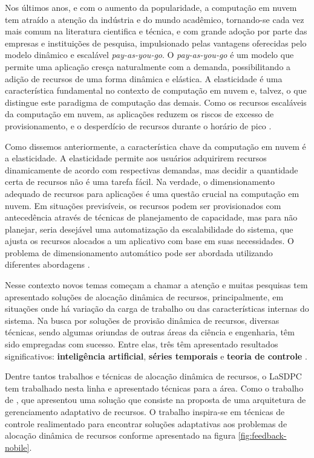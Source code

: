 Nos últimos anos, e com o aumento da popularidade, a computação em nuvem tem atraído a atenção da indústria e do mundo acadêmico, tornando-se cada vez mais comum na literatura cientifica e técnica, e com grande adoção por parte das empresas e instituições de pesquisa, impulsionado pelas vantagens oferecidas pelo modelo dinâmico e escalável \textit{pay-as-you-go}. O \textit{pay-as-you-go} é um modelo que permite uma aplicação cresça naturalmente com a demanda, possibilitando a adição de recursos de uma forma dinâmica e elástica. A elasticidade é uma característica fundamental no contexto de computação em nuvem e, talvez, o que distingue este paradigma de computação das demais. Como os recursos escaláveis da computação em nuvem, as aplicações reduzem os riscos de excesso de provisionamento, e o desperdício de recursos durante o horário de pico \cite{vazquez2014, galante2012}.

Como dissemos anteriormente, a característica chave da computação em nuvem é a elasticidade. A elasticidade permite aos usuários adquirirem recursos dinamicamente de acordo com respectivas demandas, mas decidir a quantidade certa de recursos não é uma tarefa fácil. Na verdade, o dimensionamento adequado de recursos para aplicações é uma questão crucial na computação em nuvem. Em situações previsíveis, os recursos podem ser provisionados com antecedência através de técnicas de planejamento de capacidade, mas para não planejar, seria desejável uma automatização da escalabilidade do sistema, que ajusta os recursos alocados a um aplicativo com base em suas necessidades. O problema de dimensionamento automático pode ser abordada utilizando diferentes abordagens \cite{Tania2012}.  

Nesse contexto novos temas começam a chamar a atenção e muitas pesquisas tem apresentado soluções de alocação dinâmica de recursos, principalmente, em situações onde há variação da carga de trabalho ou das características internas do sistema. 
Na busca por soluções de provisão dinâmica de recursos, diversas técnicas, sendo algumas oriundas de outras áreas da ciência e engenharia, têm sido empregadas com sucesso. Entre elas, três têm apresentado resultados significativos: \textbf{inteligência artificial}, \textbf{séries temporais} e \textbf{teoria de controle} \cite{Nobile2013}.

Dentre tantos trabalhos e técnicas de alocação dinâmica de recursos, o LaSDPC tem trabalhado nesta linha e apresentado técnicas para a área. Como o trabalho de , que apresentou uma solução que consiste na proposta de uma arquitetura de gerenciamento adaptativo de recursos. O trabalho inspira-se em técnicas de controle realimentado para encontrar soluções adaptativas aos problemas de alocação dinâmica de recursos conforme apresentado na figura \ref{fig:feedback-nobile}.

